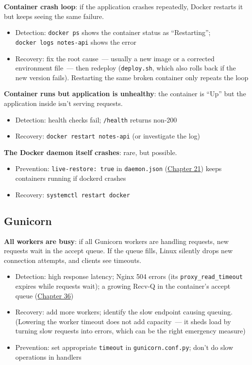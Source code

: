 \textbf{Container crash loop}: if the application crashes repeatedly, Docker restarts it but keeps seeing the same failure.

\begin{itemize}
\tightlist
\item
  Detection: \texttt{docker\ ps} shows the container status as ``Restarting''; \texttt{docker\ logs\ notes-api} shows the error
\item
  Recovery: fix the root cause~--- usually a new image or a corrected environment file~--- then redeploy (\texttt{deploy.sh}, which also rolls back if the new version fails). Restarting the same broken container only repeats the loop
\end{itemize}

\noindent{}\textbf{Container runs but application is unhealthy}: the container is ``Up'' but the application inside isn't serving requests.

\begin{itemize}
\tightlist
\item
  Detection: health checks fail; \texttt{/health} returns non-200
\item
  Recovery: \texttt{docker\ restart\ notes-}\allowbreak{}\texttt{api} (or investigate the log)
\end{itemize}

\noindent{}\textbf{The Docker daemon itself crashes}: rare, but possible.

\begin{itemize}
\tightlist
\item
  Prevention: \texttt{live-restore:\ true} in \texttt{daemon.json} (\hyperref[ch:21-system-setup]{Chapter 21}) keeps containers running if dockerd crashes
\item
  Recovery: \texttt{systemctl\ restart\ docker}
\end{itemize}

\subsection*{Gunicorn}\label{37-reliability:gunicorn}

\textbf{All workers are busy}: if all Gunicorn workers are handling requests, new requests wait in the accept queue. If the queue fills, Linux silently drops new connection attempts, and clients see timeouts.

\begin{itemize}
\tightlist
\item
  Detection: high response latency; Nginx 504 errors (its \texttt{proxy\_read\_timeout} expires while requests wait); a growing Recv-Q in the container's accept queue (\hyperref[ch:36-scaling-load]{Chapter 36})
\item
  Recovery: add more workers; identify the slow endpoint causing queuing. (Lowering the worker timeout does not add capacity~--- it sheds load by turning slow requests into errors, which can be the right emergency measure)
\item
  Prevention: set appropriate \texttt{timeout} in \texttt{gunicorn.conf.py}; don't do slow operations in handlers
\end{itemize}

